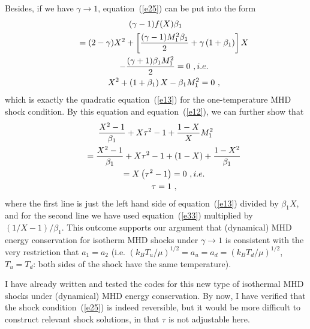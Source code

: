 \documentclass[fleqn,usenatbib]{mnras}
\begin{document}
Besides, if we have $\gamma\rightarrow 1$, equation~(\ref{e25}) can be put into the form
\begin{gather}
(\gamma-1)f(X)\beta_{1}\notag\\
\qquad =(2-\gamma)X^{2}+\left[\frac{(\gamma-1)M_{1}^{2}\beta_{1}}{2}+\gamma\left(1+\beta_{1}\right)\right]X\notag\\
\qquad -\frac{(\gamma+1)\beta_{1}M_{1}^{2}}{2}=0\ ,i.e.\notag\\
\qquad X^{2}+\left(1+\beta_{1}\right)X-\beta_{1}M_{1}^{2}=0\ ,\label{e33}
\end{gather}
which is exactly the quadratic equation~(\ref{e13}) for the one-temperature MHD shock condition. By this equation and equation~(\ref{e12}), we can further show that
\begin{gather}
\frac{X^{2}-1}{\beta_{1}}+X\tau^{2}-1+\frac{1-X}{X}M_{1}^{2}\notag\\
\qquad = \frac{X^{2}-1}{\beta_{1}}+X\tau^{2}-1+(1-X)+\frac{1-X^{2}}{\beta_{1}}\notag\\
\qquad =X\left(\tau^{2}-1\right)=0\ ,i.e.\notag\\
\qquad\tau=1\ ,\label{e35}
\end{gather}
where the first line is just the left hand side of equation~(\ref{e13}) divided by $\beta_{1}X$, and for the second line we have used equation~(\ref{e33}) multiplied by $(1/X-1)/\beta_{1}$. This outcome supports our argument that (dynamical) MHD energy conservation for isotherm MHD shocks under $\gamma\rightarrow 1$ is consistent with the very restriction that $a_{1}=a_{2}$ (i.e. $\left(k_{B}T_{u}/\mu\right)^{1/2}=a_{u}=a_{d}=\left(k_{B}T_{d}/\mu\right)^{1/2}$, $T_{u}=T_{d}$: both sides of the shock have the same temperature).

I have already written and tested the codes for this new type of isothermal MHD shocks under (dynamical) MHD energy conservation. By now, I have verified that the shock condition~(\ref{e25}) is indeed reversible, but it would be more difficult to construct relevant shock solutions, in that $\tau$ is not adjustable here.
\end{document}
